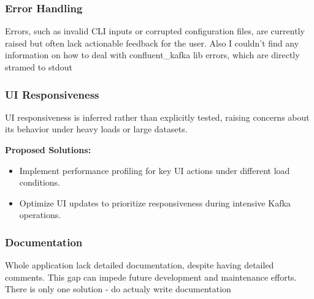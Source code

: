 \documentclass[10pt , a4paper]{report}
\begin{document}
\subsubsection{Error Handling}
Errors, such as invalid CLI inputs or corrupted configuration files, are currently raised but often lack actionable feedback for the user. Also I couldn't find any information on how to deal with confluent\_kafka lib errors, which are directly stramed to stdout


\subsubsection{UI Responsiveness}
UI responsiveness is inferred rather than explicitly tested, raising concerns about its behavior under heavy loads or large datasets.

\textbf{Proposed Solutions:}
\begin{itemize}
    \item Implement performance profiling for key UI actions under different load conditions.
    \item Optimize UI updates to prioritize responsiveness during intensive Kafka operations.
\end{itemize}


\subsubsection{Documentation}
Whole application lack detailed documentation, despite having detailed comments. This gap can impede future development and maintenance efforts. There is only one solution - do actualy write documentation


\newpage
\appendix
\end{document}
